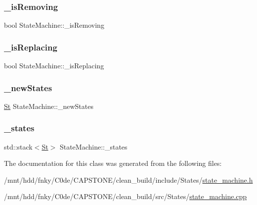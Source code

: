 \subsubsection{\texorpdfstring{\+\_\+is\+Removing}{\_isRemoving}}
{\footnotesize\ttfamily bool State\+Machine\+::\+\_\+is\+Removing\hspace{0.3cm}{\ttfamily [private]}}

\mbox{\label{classStateMachine_abb01bcc9617e9978db7afc34e03ba8d8}} 
\subsubsection{\texorpdfstring{\+\_\+is\+Replacing}{\_isReplacing}}
{\footnotesize\ttfamily bool State\+Machine\+::\+\_\+is\+Replacing\hspace{0.3cm}{\ttfamily [private]}}

\mbox{\label{classStateMachine_ac6f04aeb1c8dd6d5a5d5f28f56734eba}} 
\subsubsection{\texorpdfstring{\+\_\+new\+States}{\_newStates}}
{\footnotesize\ttfamily \hyperlink{state__machine_8h_aa31b7a5a5d2d34ce28ae8e5c4624f788}{St} State\+Machine\+::\+\_\+new\+States\hspace{0.3cm}{\ttfamily [private]}}

\mbox{\label{classStateMachine_ade8cf04e7020927c6e8ad2d714ff1ad8}} 
\subsubsection{\texorpdfstring{\+\_\+states}{\_states}}
{\footnotesize\ttfamily std\+::stack$<$\hyperlink{state__machine_8h_aa31b7a5a5d2d34ce28ae8e5c4624f788}{St}$>$ State\+Machine\+::\+\_\+states\hspace{0.3cm}{\ttfamily [private]}}



The documentation for this class was generated from the following files\+:\begin{DoxyCompactItemize}
\item 
/mnt/hdd/fnky/\+C0de/\+C\+A\+P\+S\+T\+O\+N\+E/clean\+\_\+build/include/\+States/\hyperlink{state__machine_8h}{state\+\_\+machine.\+h}\item 
/mnt/hdd/fnky/\+C0de/\+C\+A\+P\+S\+T\+O\+N\+E/clean\+\_\+build/src/\+States/\hyperlink{state__machine_8cpp}{state\+\_\+machine.\+cpp}\end{DoxyCompactItemize}
